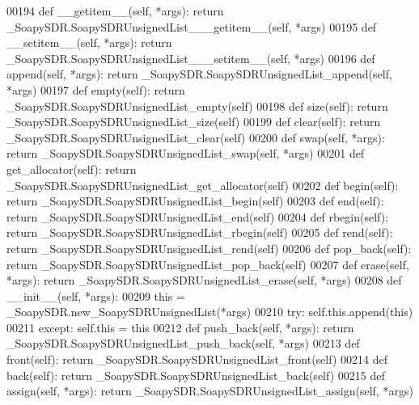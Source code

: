 \begin{DoxyCode}
{{{00194     \textcolor{keyword}{def }__getitem__(self, *args): \textcolor{keywordflow}{return} \_SoapySDR.SoapySDRUnsignedList\_\_\_getitem\_\_(self, *args)
00195     \textcolor{keyword}{def }__setitem__(self, *args): \textcolor{keywordflow}{return} \_SoapySDR.SoapySDRUnsignedList\_\_\_setitem\_\_(self, *args)
00196     \textcolor{keyword}{def }append(self, *args): \textcolor{keywordflow}{return} \_SoapySDR.SoapySDRUnsignedList\_append(self, *args)
00197     \textcolor{keyword}{def }empty(self): \textcolor{keywordflow}{return} \_SoapySDR.SoapySDRUnsignedList\_empty(self)
00198     \textcolor{keyword}{def }size(self): \textcolor{keywordflow}{return} \_SoapySDR.SoapySDRUnsignedList\_size(self)
00199     \textcolor{keyword}{def }clear(self): \textcolor{keywordflow}{return} \_SoapySDR.SoapySDRUnsignedList\_clear(self)
00200     \textcolor{keyword}{def }swap(self, *args): \textcolor{keywordflow}{return} \_SoapySDR.SoapySDRUnsignedList\_swap(self, *args)
00201     \textcolor{keyword}{def }get_allocator(self): \textcolor{keywordflow}{return} \_SoapySDR.SoapySDRUnsignedList\_get\_allocator(self)
00202     \textcolor{keyword}{def }begin(self): \textcolor{keywordflow}{return} \_SoapySDR.SoapySDRUnsignedList\_begin(self)
00203     \textcolor{keyword}{def }end(self): \textcolor{keywordflow}{return} \_SoapySDR.SoapySDRUnsignedList\_end(self)
00204     \textcolor{keyword}{def }rbegin(self): \textcolor{keywordflow}{return} \_SoapySDR.SoapySDRUnsignedList\_rbegin(self)
00205     \textcolor{keyword}{def }rend(self): \textcolor{keywordflow}{return} \_SoapySDR.SoapySDRUnsignedList\_rend(self)
00206     \textcolor{keyword}{def }pop_back(self): \textcolor{keywordflow}{return} \_SoapySDR.SoapySDRUnsignedList\_pop\_back(self)
00207     \textcolor{keyword}{def }erase(self, *args): \textcolor{keywordflow}{return} \_SoapySDR.SoapySDRUnsignedList\_erase(self, *args)
00208     \textcolor{keyword}{def }__init__(self, *args): 
00209         this = \_SoapySDR.new\_SoapySDRUnsignedList(*args)
00210         \textcolor{keywordflow}{try}: self.this.append(this)
00211         \textcolor{keywordflow}{except}: self.this = this
00212     \textcolor{keyword}{def }push_back(self, *args): \textcolor{keywordflow}{return} \_SoapySDR.SoapySDRUnsignedList\_push\_back(self, *args)
00213     \textcolor{keyword}{def }front(self): \textcolor{keywordflow}{return} \_SoapySDR.SoapySDRUnsignedList\_front(self)
00214     \textcolor{keyword}{def }back(self): \textcolor{keywordflow}{return} \_SoapySDR.SoapySDRUnsignedList\_back(self)
00215     \textcolor{keyword}{def }assign(self, *args): \textcolor{keywordflow}{return} \_SoapySDR.SoapySDRUnsignedList\_assign(self, *args)
}}}
\end{DoxyCode}
